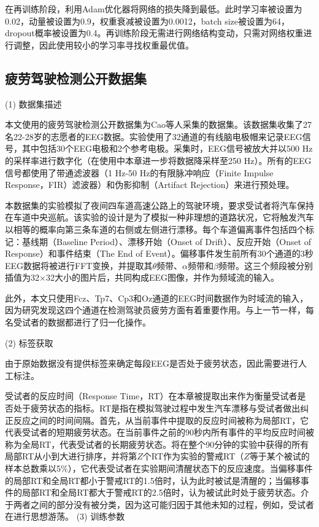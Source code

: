 在再训练阶段，利用Adam优化器将网络的损失降到最低。此时学习率被设置为0.02，动量被设置为0.9，权重衰减被设置为0.0012，batch size被设置为64，dropout概率被设置为0.4。再训练阶段无需进行网络结构变动，只需对网络权重进行调整，因此使用较小的学习率寻找权重最优值。

\subsection{疲劳驾驶检测公开数据集}

(1) 数据集描述

本文使用的疲劳驾驶检测公开数据集为Cao等人采集的数据集\cite{3-16}。该数据集收集了27名22-28岁的志愿者的EEG数据。实验使用了32通道的有线脑电极帽来记录EEG信号，其中包括30个EEG电极和2个参考电极。采集时，EEG信号被放大并以500 Hz的采样率进行数字化（在使用中本章进一步将数据降采样至250 Hz）。所有的EEG信号都使用了带通滤波器（1 Hz-50 Hz的有限脉冲响应（Finite Impulse Response，FIR）滤波器）和伪影抑制（Artifact Rejection）来进行预处理。

本数据集的实验模拟了夜间四车道高速公路上的驾驶环境，要求受试者将汽车保持在车道中央巡航。该实验的设计是为了模拟一种非理想的道路状况，它将触发汽车以相等的概率向第三条车道的右侧或左侧进行漂移。每个车道偏离事件包括四个标记：基线期（Baseline Period）、漂移开始（Onset of Drift）、反应开始（Onset of Response）和事件结束（The End of Event）。偏移事件发生前所有30个通道的3秒EEG数据将被进行FFT变换，并提取其$\theta$频带、$\alpha$频带和$\beta$频带。这三个频段被分别插值为32×32大小的图片后，共同构成EEG图像，并作为频域流的输入。


此外，本文只使用Fcz、Tp7、Cp3和Oz通道的EEG时间数据作为时域流的输入，因为研究发现这四个通道在检测驾驶员疲劳方面有着重要作用\cite{3-17}。与上一节一样，每名受试者的数据都进行了归一化操作。

(2) 标签获取

由于原始数据没有提供标签来确定每段EEG是否处于疲劳状态，因此需要进行人工标注。

受试者的反应时间（Response Time，RT）在本章被提取出来作为衡量受试者是否处于疲劳状态的指标。RT是指在模拟驾驶过程中发生汽车漂移与受试者做出纠正反应之间的时间间隔。首先，从当前事件中提取的反应时间被称为局部RT，它代表受试者的短期疲劳状态。在当前事件之前的90秒内所有事件的平均反应时间被称为全局RT，代表受试者的长期疲劳状态。将在整个90分钟的实验中获得的所有局部RT从小到大进行排序，并将第$Z$个RT作为实验的警戒RT（$Z$等于某个被试的样本总数乘以5\%），它代表受试者在实验期间清醒状态下的反应速度。当偏移事件的局部RT和全局RT都小于警戒RT的1.5倍时，认为此时被试是清醒的；当偏移事件的局部RT和全局RT都大于警戒RT的2.5倍时，认为被试此时处于疲劳状态。介于两者之间的部分没有被分类，因为这可能归因于其他未知的过程，例如，受试者在进行思想游荡\cite{3-18}。
\newpage
(3) 训练参数

